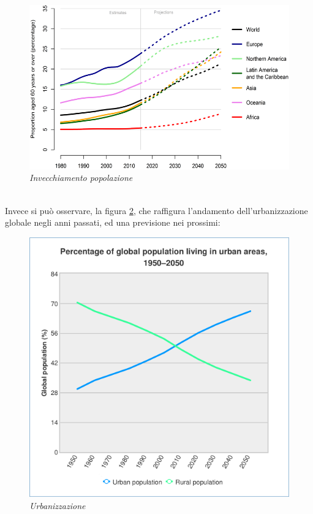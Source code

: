 \begin{figure}[!h]
    \centering
	\includegraphics{Tesi/images/invecchiamento-popolazione.png}
	\caption{\textit{Invecchiamento popolazione \cite{invecchiamento}}}
	\label{fig:invecchiamento}
\end{figure}
\\Invece si può osservare, la figura \ref{fig:urbanizzazione}, che raffigura l'andamento dell'urbanizzazione globale negli anni passati, ed una previsione nei prossimi:
\begin{figure}[!h]
    \centering
	\includegraphics{Tesi/images/urbanizzazione.png}
	\caption{\textit{Urbanizzazione \cite{urbanizzazione}}}
	\label{fig:urbanizzazione}
\end{figure}
\pagebreak
